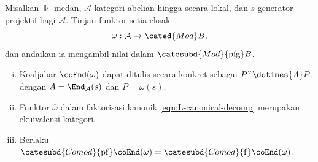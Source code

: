 \begin{lemma}\label{prop:Tannaka-projective-generator}
	Misalkan $\Bbbk$ medan, $\mathcal{A}$ kategori abelian hingga secara lokal, dan
	$s$ generator projektif bagi $\mathcal{A}$. Tinjau funktor setia eksak
	\[ \omega: \mathcal{A} \to \cated{Mod}B, \]
	dan andaikan ia mengambil nilai dalam
	$\catesubd{Mod}{\mathrm{pfg}}B$.
	\begin{enumerate}[(i)]
		\item Koaljabar $\coEnd(\omega)$ dapat ditulis secara konkret sebagai
		$P^\vee\dotimes{A}P$, dengan
		$A=\End_{\mathcal{A}}(s)$ dan $P=\omega(s)$.
		\item Funktor $\overline\omega$ dalam faktorisasi kanonik
		\eqref{eqn:L-canonical-decomp} merupakan ekuivalensi kategori.
		\item Berlaku
		$\catesubd{Comod}{\mathrm{pf}}\coEnd(\omega)=
		\catesubd{Comod}{\mathrm f}\coEnd(\omega)$.
	\end{enumerate}
\end{lemma}
